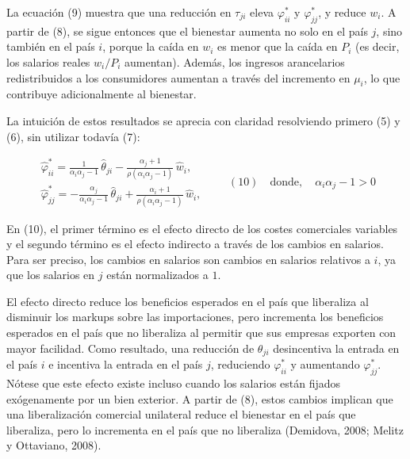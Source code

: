 \documentclass[10pt,a4paper]{article}
\begin{document}
La ecuación (9) muestra que una reducción en $\tau_{ji}$ eleva $\varphi_{ii}^*$ y $\varphi_{jj}^*$, y reduce $w_i$. A partir de (8), se sigue entonces que el bienestar aumenta no solo en el país $j$, sino también en el país $i$, porque la caída en $w_i$ es menor que la caída en $P_i$ (es decir, los salarios reales $w_i/P_i$ aumentan). Además, los ingresos arancelarios redistribuidos a los consumidores aumentan a través del incremento en $\mu_i$, lo que contribuye adicionalmente al bienestar.

La intuición de estos resultados se aprecia con claridad resolviendo primero (5) y (6), sin utilizar todavía (7):

$$\begin{aligned}
    \hat{\varphi}_{ii}^*=\frac{1}{\alpha_i\alpha_j-1}\,\hat{\theta}_{ji}-\frac{\alpha_j+1}{\rho(\alpha_i\alpha_j-1)}\,\hat{w}_i,\\[2em]
    \hat{\varphi}_{jj}^*=-\frac{\alpha_j}{\alpha_i\alpha_j-1}\,\hat{\theta}_{ji}+\frac{\alpha_i+1}{\rho(\alpha_i\alpha_j-1)}\,\hat{w}_i, 
\end{aligned}\qquad (10)\quad \text{donde},\quad  \alpha_i\alpha_j-1>0
$$

En (10), el primer término es el efecto directo de los costes comerciales variables y el segundo término es el efecto indirecto a través de los cambios en salarios. Para ser preciso, los cambios en salarios son cambios en salarios relativos a $i$, ya que los salarios en $j$ están normalizados a $1$.

El efecto directo reduce los beneficios esperados en el país que liberaliza al disminuir los markups sobre las importaciones, pero incrementa los beneficios esperados en el país que no liberaliza al permitir que sus empresas exporten con mayor facilidad. Como resultado, una reducción de $\theta_{ji}$ desincentiva la entrada en el país $i$ e incentiva la entrada en el país $j$, reduciendo $\varphi_{ii}^*$ y aumentando $\varphi_{jj}^*$. Nótese que este efecto existe incluso cuando los salarios están fijados exógenamente por un bien exterior. A partir de (8), estos cambios implican que una liberalización comercial unilateral reduce el bienestar en el país que liberaliza, pero lo incrementa en el país que no liberaliza (Demidova, 2008; Melitz y Ottaviano, 2008).
\end{document}
